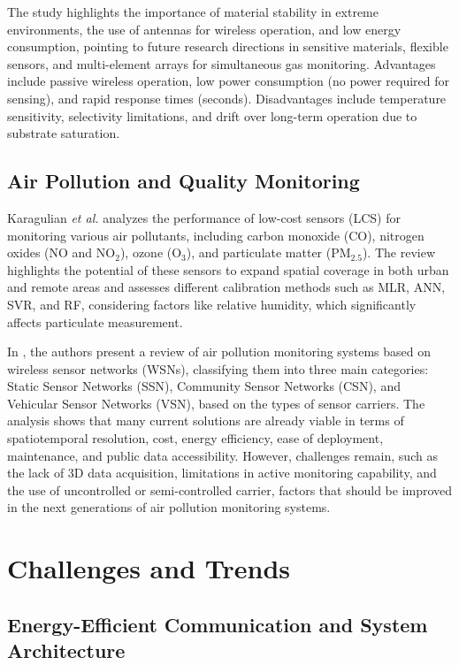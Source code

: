 \documentclass[conference]{IEEEtran}
\begin{document}
The study highlights the importance of material stability in extreme environments, the use of antennas for wireless operation, and low energy consumption, pointing to future research directions in sensitive materials, flexible sensors, and multi-element arrays for simultaneous gas monitoring. Advantages include passive wireless operation, low power consumption (no power required for sensing), and rapid response times (seconds). Disadvantages include temperature sensitivity, selectivity limitations, and drift over long-term operation due to substrate saturation.

\subsection{Air Pollution and Quality Monitoring}
Karagulian \textit{et al.} \cite{karagulian_2019_review} analyzes the performance of low-cost sensors (LCS) for monitoring various air pollutants, including carbon monoxide (CO), nitrogen oxides (NO and NO$_2$), ozone (O$_3$), and particulate matter (PM$_{2.5}$). The review highlights the potential of these sensors to expand spatial coverage in both urban and remote areas and assesses different calibration methods such as MLR, ANN, SVR, and RF, considering factors like relative humidity, which significantly affects particulate measurement.

In \cite{yi_2015_a}, the authors present a review of air pollution monitoring systems based on wireless sensor networks (WSNs), classifying them into three main categories: Static Sensor Networks (SSN), Community Sensor Networks (CSN), and Vehicular Sensor Networks (VSN), based on the types of sensor carriers. The analysis shows that many current solutions are already viable in terms of spatiotemporal resolution, cost, energy efficiency, ease of deployment, maintenance, and public data accessibility. However, challenges remain, such as the lack of 3D data acquisition, limitations in active monitoring capability, and the use of uncontrolled or semi-controlled carrier, factors that should be improved in the next generations of air pollution monitoring systems.

\section{Challenges and Trends} \label{cap:challenges}

\subsection{Energy-Efficient Communication and System Architecture}
\end{document}
